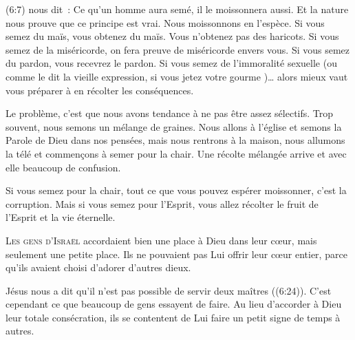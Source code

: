 
(6:7) nous dit~: 
 \og Ce qu'un homme aura semé, il le moissonnera aussi. \fg{}
 Et la nature nous prouve que ce principe est vrai.
 Nous moissonnons en l'espèce. Si vous semez du maïs, vous obtenez du maïs.
 Vous n'obtenez pas des haricots. Si vous semez de la miséricorde,
 on fera preuve de miséricorde envers vous. Si vous semez du pardon,
 vous recevrez le pardon. Si vous semez de l'immoralité sexuelle
 (ou comme le dit la vieille expression,
 \og si vous jetez votre gourme \fg{})\dots{}
 alors mieux vaut vous préparer à en récolter les conséquences. 

Le problème, c'est que nous avons tendance à ne pas être assez sélectifs.
 Trop souvent, nous semons un mélange de graines.
 Nous allons à l'église et semons la Parole de Dieu dans nos pensées,
 mais nous rentrons à la maison, nous allumons la télé et commençons à semer
 pour la chair. Une récolte mélangée arrive et avec elle beaucoup de confusion. 

Si vous semez pour la chair, tout ce que vous pouvez espérer moissonner,
 c'est la corruption. Mais si vous semez pour l'Esprit,
 vous allez récolter le fruit de l'Esprit et la vie éternelle. 

\dvrule






\lettrine{L}{es gens d'Israël} accordaient bien une place à Dieu
 dans leur cœur, mais seulement une petite place.
 Ils ne pouvaient pas Lui offrir leur cœur entier,
 parce qu'ils avaient choisi d'adorer d'autres dieux. 

Jésus nous a dit qu'il n'est pas possible de servir deux maîtres
 ((6:24)).
 C'est cependant ce que beaucoup de gens essayent de faire.
 Au lieu d'accorder à Dieu leur totale consécration,
 ils se contentent de Lui faire un petit signe de temps à autres. 


